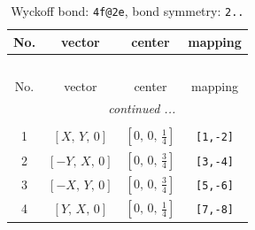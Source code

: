 \documentclass[fleqn,8pt]{jsarticle}
\begin{document}
\renewcommand{\arraystretch}{1.2}
\begin{longtable}{cccc}
\caption{Wyckoff bond: {\tt 4f@2e}, bond symmetry: {\tt 2..}}
 \\
 \hline \hline
No. & vector & center & mapping \\ \hline \endfirsthead

\multicolumn{3}{l}{\tablename\ \thetable{}} \\
 \hline \hline
No. & vector & center & mapping \\ \hline \endhead

 \hline \hline
\multicolumn{3}{r}{\footnotesize\it continued ...} \\ \endfoot

 \hline \hline
\multicolumn{3}{r}{} \\ \endlastfoot

1 & $\left[ X,\, Y,\, 0 \right]$ & $\left[ 0,\, 0,\, \frac{1}{4} \right]$ & {\tt [1,-2]} \\ \hline
2 & $\left[ - Y,\, X,\, 0 \right]$ & $\left[ 0,\, 0,\, \frac{3}{4} \right]$ & {\tt [3,-4]} \\ \hline
3 & $\left[ - X,\, Y,\, 0 \right]$ & $\left[ 0,\, 0,\, \frac{3}{4} \right]$ & {\tt [5,-6]} \\ \hline
4 & $\left[ Y,\, X,\, 0 \right]$ & $\left[ 0,\, 0,\, \frac{1}{4} \right]$ & {\tt [7,-8]} \\
\end{longtable}
\renewcommand{\arraystretch}{1.2}
\end{document}
